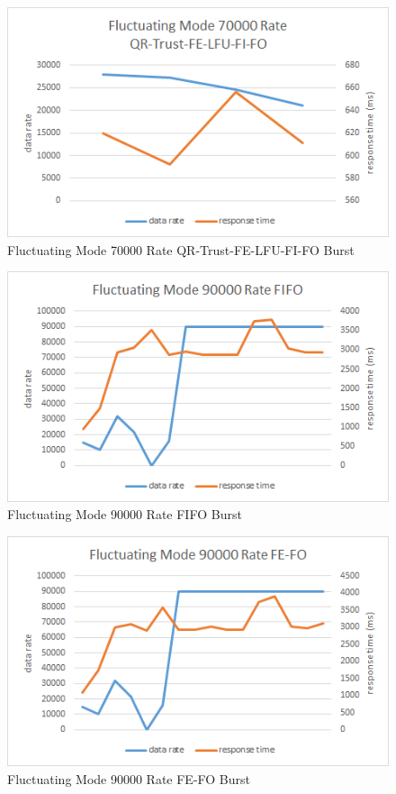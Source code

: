 \begin{figure}[!htbp]
	\centering
	\includegraphics[width=\textwidth]{img/app3-f-70000-qrtrustfelfufifo.png}
	\caption{Fluctuating Mode 70000 Rate QR-Trust-FE-LFU-FI-FO Burst}
\end{figure}
\begin{figure}[!htbp]
	\centering
	\includegraphics[width=\textwidth]{img/app3-f-90000-fifo.png}
	\caption{Fluctuating Mode 90000 Rate FIFO Burst}
\end{figure}
\begin{figure}[!htbp]
	\centering
	\includegraphics[width=\textwidth]{img/app3-f-90000-fefo.png}
	\caption{Fluctuating Mode 90000 Rate FE-FO Burst}
\end{figure}
